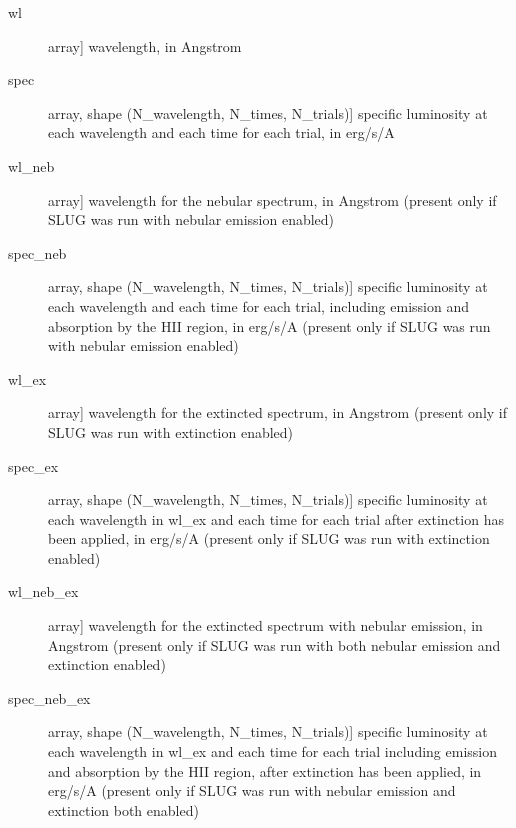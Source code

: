 \documentclass[letterpaper,10pt,english]{sphinxmanual}
\begin{document}
\begin{fulllineitems}
\begin{description}
\begin{description}
\item[{wl}] \leavevmode{[}array{]}
wavelength, in Angstrom

\item[{spec}] \leavevmode{[}array, shape (N\_wavelength, N\_times, N\_trials){]}
specific luminosity at each wavelength and each time for each
trial, in erg/s/A

\item[{wl\_neb}] \leavevmode{[}array{]}
wavelength for the nebular spectrum, in Angstrom (present
only if SLUG was run with nebular emission enabled)

\item[{spec\_neb}] \leavevmode{[}array, shape (N\_wavelength, N\_times, N\_trials){]}
specific luminosity at each wavelength and each time for each
trial, including emission and absorption by the HII region,
in erg/s/A (present only if SLUG was run with nebular
emission enabled)

\item[{wl\_ex}] \leavevmode{[}array{]}
wavelength for the extincted spectrum, in Angstrom (present
only if SLUG was run with extinction enabled)

\item[{spec\_ex}] \leavevmode{[}array, shape (N\_wavelength, N\_times, N\_trials){]}
specific luminosity at each wavelength in wl\_ex and each
time for each trial after extinction has been applied, in
erg/s/A (present only if SLUG was run with extinction
enabled)

\item[{wl\_neb\_ex}] \leavevmode{[}array{]}
wavelength for the extincted spectrum with nebular emission,
in Angstrom (present only if SLUG was run with both nebular
emission and extinction enabled)

\item[{spec\_neb\_ex}] \leavevmode{[}array, shape (N\_wavelength, N\_times, N\_trials){]}
specific luminosity at each wavelength in wl\_ex and each
time for each trial including emission and absorption by the
HII region, after extinction has been applied, in erg/s/A
(present only if SLUG was run with nebular emission and
extinction both enabled)

\end{description}

\end{description}

\end{fulllineitems}

\end{document}
